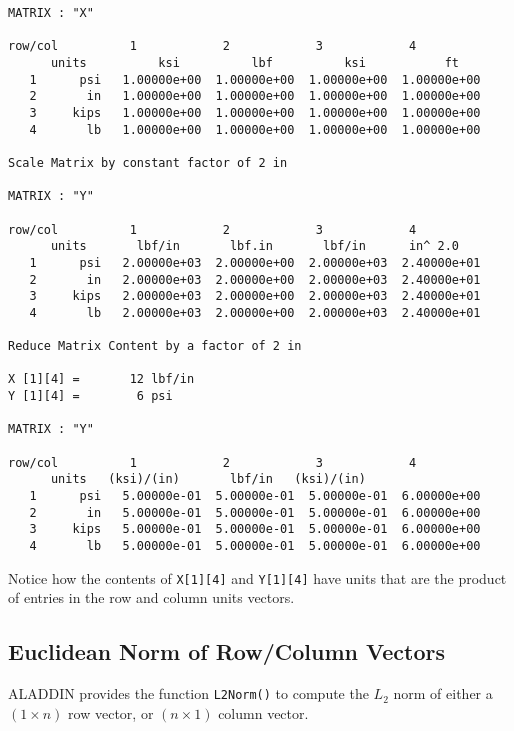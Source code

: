 \begin{footnotesize}
\begin{verbatim}
MATRIX : "X"

row/col          1            2            3            4          
      units          ksi          lbf          ksi           ft   
   1      psi   1.00000e+00  1.00000e+00  1.00000e+00  1.00000e+00
   2       in   1.00000e+00  1.00000e+00  1.00000e+00  1.00000e+00
   3     kips   1.00000e+00  1.00000e+00  1.00000e+00  1.00000e+00
   4       lb   1.00000e+00  1.00000e+00  1.00000e+00  1.00000e+00

Scale Matrix by constant factor of 2 in 

MATRIX : "Y"

row/col          1            2            3            4          
      units       lbf/in       lbf.in       lbf/in      in^ 2.0   
   1      psi   2.00000e+03  2.00000e+00  2.00000e+03  2.40000e+01
   2       in   2.00000e+03  2.00000e+00  2.00000e+03  2.40000e+01
   3     kips   2.00000e+03  2.00000e+00  2.00000e+03  2.40000e+01
   4       lb   2.00000e+03  2.00000e+00  2.00000e+03  2.40000e+01

Reduce Matrix Content by a factor of 2 in 

X [1][4] =       12 lbf/in
Y [1][4] =        6 psi

MATRIX : "Y"

row/col          1            2            3            4          
      units   (ksi)/(in)       lbf/in   (ksi)/(in)             
   1      psi   5.00000e-01  5.00000e-01  5.00000e-01  6.00000e+00
   2       in   5.00000e-01  5.00000e-01  5.00000e-01  6.00000e+00
   3     kips   5.00000e-01  5.00000e-01  5.00000e-01  6.00000e+00
   4       lb   5.00000e-01  5.00000e-01  5.00000e-01  6.00000e+00
\end{verbatim}
\end{footnotesize}

\vspace{0.15 in}\noindent
Notice how the contents of {\tt X[1][4]}
and {\tt Y[1][4]} have units that are the product of entries
in the row and column units vectors.

\subsection{Euclidean Norm of Row/Column Vectors}

\vspace{0.15 in}
\noindent\hspace{0.51 in}
ALADDIN provides the function {\tt L2Norm()} to compute the $L_2$
norm of either a $(1 \times n)$ row vector, or $(n \times 1)$ column vector.

